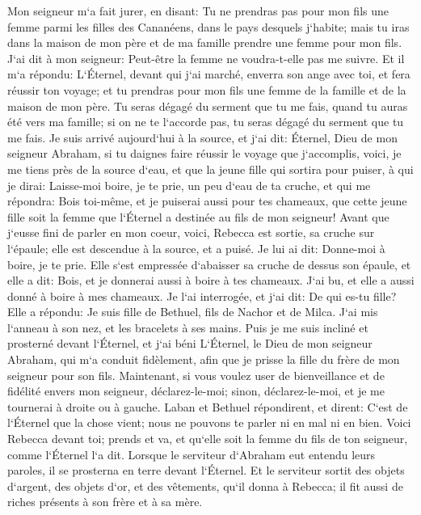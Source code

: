 \verse Mon seigneur m`a fait jurer, en disant: Tu ne prendras pas pour mon fils une femme parmi les filles des Cananéens, dans le pays desquels j`habite; 
\verse mais tu iras dans la maison de mon père et de ma famille prendre une femme pour mon fils. 
\verse J`ai dit à mon seigneur: Peut-être la femme ne voudra-t-elle pas me suivre. 
\verse Et il m`a répondu: L`Éternel, devant qui j`ai marché, enverra son ange avec toi, et fera réussir ton voyage; et tu prendras pour mon fils une femme de la famille et de la maison de mon père. 
\verse Tu seras dégagé du serment que tu me fais, quand tu auras été vers ma famille; si on ne te l`accorde pas, tu seras dégagé du serment que tu me fais. 
\verse Je suis arrivé aujourd`hui à la source, et j`ai dit: Éternel, Dieu de mon seigneur Abraham, si tu daignes faire réussir le voyage que j`accomplis, 
\verse voici, je me tiens près de la source d`eau, et que la jeune fille qui sortira pour puiser, à qui je dirai: Laisse-moi boire, je te prie, un peu d`eau de ta cruche, et qui me répondra: 
\verse Bois toi-même, et je puiserai aussi pour tes chameaux, que cette jeune fille soit la femme que l`Éternel a destinée au fils de mon seigneur! 
\verse Avant que j`eusse fini de parler en mon coeur, voici, Rebecca est sortie, sa cruche sur l`épaule; elle est descendue à la source, et a puisé. Je lui ai dit: Donne-moi à boire, je te prie. 
\verse Elle s`est empressée d`abaisser sa cruche de dessus son épaule, et elle a dit: Bois, et je donnerai aussi à boire à tes chameaux. J`ai bu, et elle a aussi donné à boire à mes chameaux. 
\verse Je l`ai interrogée, et j`ai dit: De qui es-tu fille? Elle a répondu: Je suis fille de Bethuel, fils de Nachor et de Milca. J`ai mis l`anneau à son nez, et les bracelets à ses mains. 
\verse Puis je me suis incliné et prosterné devant l`Éternel, et j`ai béni L`Éternel, le Dieu de mon seigneur Abraham, qui m`a conduit fidèlement, afin que je prisse la fille du frère de mon seigneur pour son fils. 
\verse Maintenant, si vous voulez user de bienveillance et de fidélité envers mon seigneur, déclarez-le-moi; sinon, déclarez-le-moi, et je me tournerai à droite ou à gauche. 
\verse Laban et Bethuel répondirent, et dirent: C`est de l`Éternel que la chose vient; nous ne pouvons te parler ni en mal ni en bien. 
\verse Voici Rebecca devant toi; prends et va, et qu`elle soit la femme du fils de ton seigneur, comme l`Éternel l`a dit. 
\verse Lorsque le serviteur d`Abraham eut entendu leurs paroles, il se prosterna en terre devant l`Éternel. 
\verse Et le serviteur sortit des objets d`argent, des objets d`or, et des vêtements, qu`il donna à Rebecca; il fit aussi de riches présents à son frère et à sa mère. 
